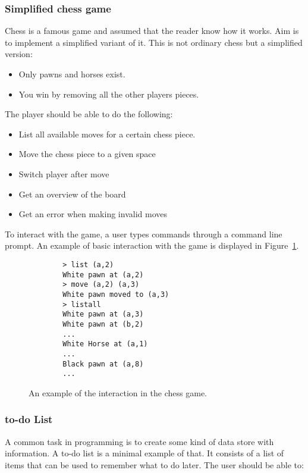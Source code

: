 \documentclass[12pt]{report}
\theoremstyle{definition}
\theoremstyle{theorem}
\begin{document}
\subsubsection*{Simplified chess game}

Chess is a famous game and assumed that the reader know how it works. Aim
is to implement a simplified variant of it. This is not ordinary chess but a
simplified version:

\begin{itemize} 
    \item Only pawns and horses exist.
    \item You win by removing all the other players pieces.
\end{itemize}

The player should be able to do the following:

\begin{itemize} 
    \item List all available moves for a certain chess piece. 
    \item Move the chess piece to a given space
    \item Switch player after move
    \item Get an overview of the board
    \item Get an error when making invalid moves
\end{itemize}

To interact with the game, a user types commands through a command line prompt.
An example of basic interaction with the game is displayed in
Figure~\ref{chessexample}.

\begin{figure}[H]
    \centering
    \begin{lstlisting}
        > list (a,2)
        White pawn at (a,2)
        > move (a,2) (a,3)
        White pawn moved to (a,3)
        > listall
        White pawn at (a,3)
        White pawn at (b,2)
        ...
        White Horse at (a,1)
        ...
        Black pawn at (a,8)
        ...
    \end{lstlisting}
    \label{chessexample}
    \caption{An example of the interaction in the chess game.}
\end{figure}


\subsubsection*{to-do List}

A common task in programming is to create some kind of data store with
information. A to-do list is a minimal example of that. It consists of a list of
items that can be used to remember what to do later. The user should be able to:
\end{document}
